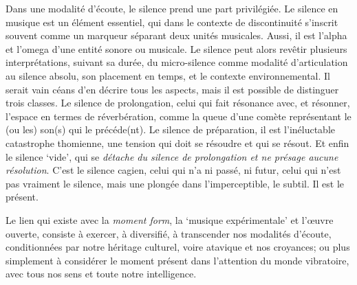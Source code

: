 \documentclass{article}
\begin{document}
Dans une modalité d'écoute, le silence prend une part privilégiée. 
Le silence en musique est un élément essentiel, qui dans le contexte de discontinuité s'inscrit souvent comme un marqueur séparant deux unités musicales. Aussi, il est l'alpha et l'omega d'une entité sonore ou musicale. Le silence peut alors revêtir plusieurs interprétations, suivant sa durée, du micro-silence comme modalité d'articulation au silence absolu, son placement en temps, et le contexte environnemental. Il serait vain céans d'en décrire tous les aspects, mais il est possible de distinguer trois classes. Le silence de prolongation, celui qui fait résonance avec, et résonner, l'espace en termes de réverbération, comme la queue d'une comète représentant le (ou les) son(s) qui le précéde(nt). Le silence de préparation, il est l'inéluctable catastrophe thomienne\label{efn:thom}, une tension qui doit se résoudre et qui se résout. Et enfin le silence `vide', qui se \textit{détache du silence de prolongation et ne présage aucune résolution}. C'est le silence cagien, celui qui n'a ni passé, ni futur, celui qui n'est pas vraiment le silence, mais une plongée dans l'imperceptible, le subtil. Il est le présent.

Le lien qui existe avec la \textit{moment form}, la `musique expérimentale' et l'œuvre ouverte, consiste à exercer, à diversifié, à transcender nos modalités d'écoute, conditionnées par notre héritage culturel, voire atavique et nos croyances; ou plus simplement à considérer le moment présent dans l'attention du monde vibratoire, avec tous nos sens et toute notre intelligence.
\end{document}
